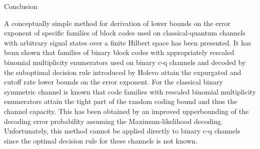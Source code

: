 \begin{slide*}\sf
\begin{center}{\bsf Conclusion}\end{center}
\vfill
A conceptually simple method for derivation of lower bounds on the error 
exponent of specific families of block codes used on classical-quantum 
channels with arbitrary signal states over a finite Hilbert space has been 
presented.
It has benn shown that families of binary block codes with appropriately 
rescaled binomial multiplicity enumerators used on binary
c-q channels and decoded by the suboptimal decision rule 
introduced by Holevo attain the expurgated and cutoff rate lower bounds on the 
error exponent.
\vfill
For the classical binary symmetric channel is known that code
families with rescaled binomial multiplicity enumerators attain the tight
part of the random coding bound and thus the channel capacity. This has been 
obtained by an improved upperbounding of the decoding error probability 
assuming the Maximum-likelihood decoding. Unfortunately, this method cannot be 
applied directly to binary c-q channels since the optimal
decision rule for these channels is not known.
\vfill
\end{slide*}











